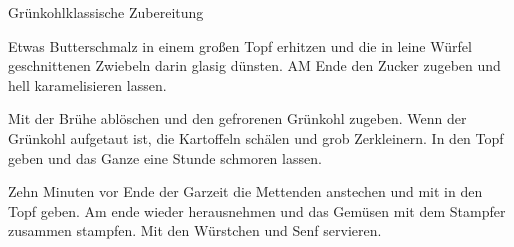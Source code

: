 \begin{recipe}{Grünkohl}{klassische Zubereitung}
  \label{Grünkohl}
  \inglist

  \steps
  Etwas Butterschmalz in einem großen Topf erhitzen und die in leine Würfel
  geschnittenen Zwiebeln darin glasig dünsten. AM Ende den Zucker zugeben und
  hell karamelisieren lassen.

  Mit der Brühe ablöschen und den gefrorenen Grünkohl zugeben. Wenn der
  Grünkohl aufgetaut ist, die Kartoffeln schälen und grob Zerkleinern. In den
  Topf geben und das Ganze eine Stunde schmoren lassen.

  Zehn Minuten vor Ende der Garzeit die Mettenden anstechen und mit in den Topf
  geben. Am ende wieder herausnehmen und das Gemüsen mit dem Stampfer zusammen
  stampfen. Mit den Würstchen und Senf servieren.
\end{recipe}
